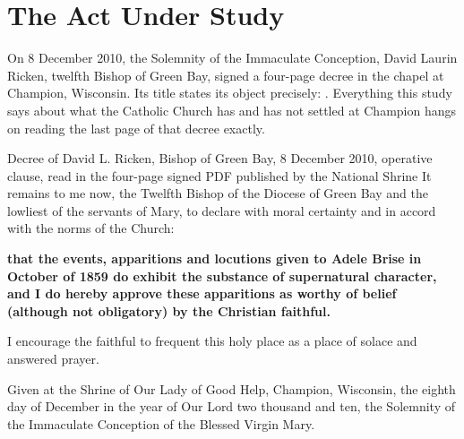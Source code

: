 \section{The Act Under Study}

On 8 December 2010, the Solemnity of the Immaculate Conception, David
Laurin Ricken, twelfth Bishop of Green Bay, signed a four-page decree
in the chapel at Champion, Wisconsin. Its title states its object
precisely: . Everything this study says
about what the Catholic Church has and has not settled at Champion
hangs on reading the last page of that decree exactly.

\begin{operativetext}{Decree of David L. Ricken, Bishop of Green Bay, 8
December 2010, operative clause, read in the four-page signed PDF
published by the National Shrine}
It remains to me now, the Twelfth Bishop of the Diocese of Green Bay
and the lowliest of the servants of Mary, to declare with moral
certainty and in accord with the norms of the Church:\par
\textbf{that the events, apparitions and locutions given to Adele Brise
in October of 1859 do exhibit the substance of supernatural character,
and I do hereby approve these apparitions as worthy of belief (although
not obligatory) by the Christian faithful.}\par
I encourage the faithful to frequent this holy place as a place of
solace and answered prayer.\par
Given at the Shrine of Our Lady of Good Help, Champion, Wisconsin, the
eighth day of December in the year of Our Lord two thousand and ten,
the Solemnity of the Immaculate Conception of the Blessed Virgin
Mary.
\end{operativetext}

